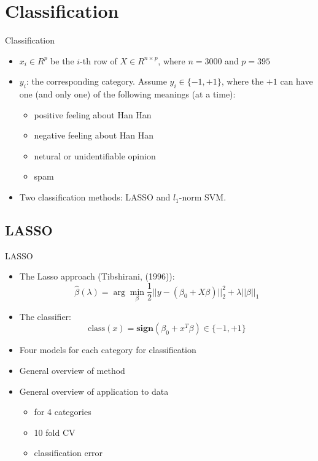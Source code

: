 \documentclass[12pt, trans]{beamer}
\newcommand{\1}[1]{{\mathbf 1}\left\{#1\right\}}        %
\begin{document}
\clearpage 
\section{Classification}

\begin{frame}{Classification}


\begin{itemize}[<+->]


\item $x_i\in R^{p}$ be the $i$-th row of $X\in R^{n\times p}$, where $n=3000$ and $p=395$
\item $y_i$: the corresponding category. Assume $y_i\in\{-1,+1\}$, where the $+1$ can have one (and only one) of the following meanings (at a time):
  \begin{itemize}[<+->]
    \item positive feeling about Han Han
    \item negative feeling about Han Han 
    \item netural or unidentifiable opinion 
    \item spam
\end{itemize}
\item Two classification methods: LASSO and $l_1$-norm SVM.
\end{itemize}
\end{frame}
\subsection{LASSO}

\begin{frame}[fragile]{LASSO}
\begin{itemize}[<+->]

\item The Lasso approach (Tibshirani, (1996)):
\[
\hat{\beta}(\lambda) = \arg \min_\beta \frac{1}{2}||y-(\beta_0+X\beta)||_2^2 + \lambda ||\beta||_1
\]
\item The classifier:
\[
\text{class}(x) = \textbf{sign}(\beta_0+x^T\beta)\in\{-1,+1\}
\]

\item Four models for each category for classification
\item General overview of method
\item General overview of application to data
	\begin{itemize}
	\item for 4 categories
	\item 10 fold CV
	\item classification error
	\end{itemize}
	
\end{itemize}

\end{frame}
\end{document}
